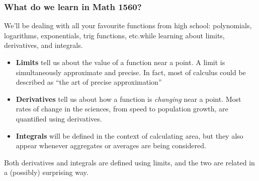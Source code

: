 \documentclass[10pt,]{article}
\newcommand{\terminology}[1]{\textbf{#1}}
\begin{document}
\subsubsection[{What do we learn in Math 1560?}]{What do we learn in Math 1560?}\label{subsubsection-7}
\hypertarget{p-13}{}%
We'll be dealing with all your favourite functions from high school: polynomials, logarithms, exponentials, trig functions, etc.\@ while learning about limits, derivatives, and integrals.%
\leavevmode%
\begin{itemize}[label=\textbullet]
\item{}\terminology{Limits} tell us about the value of a function near a point. A limit is simultaneously approximate and precise. In fact, most of calculus could be described as ``the art of precise approximation''%
\item{}\terminology{Derivatives} tell us about how a function is \emph{changing} near a point. Most rates of change in the sciences, from speed to population growth, are quantified using derivatives.%
\item{}\terminology{Integrals} will be defined in the context of calculating area, but they also appear whenever aggregates or averages are being considered.%
\end{itemize}
\hypertarget{p-14}{}%
Both derivatives and integrals are defined using limits, and the two are related in a (possibly) surprising way.%
%
%
\typeout{************************************************}
\typeout{************************************************}
%
\end{document}

